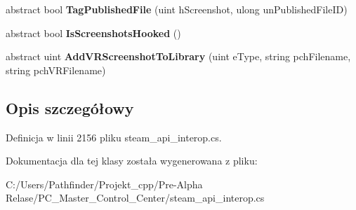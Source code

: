 \begin{DoxyCompactItemize}
abstract bool {\bfseries Tag\+Published\+File} (uint h\+Screenshot, ulong un\+Published\+File\+ID)
\item 
\mbox{\label{class_valve_1_1_steamworks_1_1_i_steam_screenshots_a071b5c9d6249e57732bbe22d8ab9d8ac}} 
abstract bool {\bfseries Is\+Screenshots\+Hooked} ()
\item 
\mbox{\label{class_valve_1_1_steamworks_1_1_i_steam_screenshots_aa69859907112ec0be2850d555d86b25c}} 
abstract uint {\bfseries Add\+V\+R\+Screenshot\+To\+Library} (uint e\+Type, string pch\+Filename, string pch\+V\+R\+Filename)
\end{DoxyCompactItemize}


\subsection{Opis szczegółowy}


Definicja w linii 2156 pliku steam\+\_\+api\+\_\+interop.\+cs.



Dokumentacja dla tej klasy została wygenerowana z pliku\+:\begin{DoxyCompactItemize}
\item 
C\+:/\+Users/\+Pathfinder/\+Projekt\+\_\+cpp/\+Pre-\/\+Alpha Relase/\+P\+C\+\_\+\+Master\+\_\+\+Control\+\_\+\+Center/steam\+\_\+api\+\_\+interop.\+cs\end{DoxyCompactItemize}
